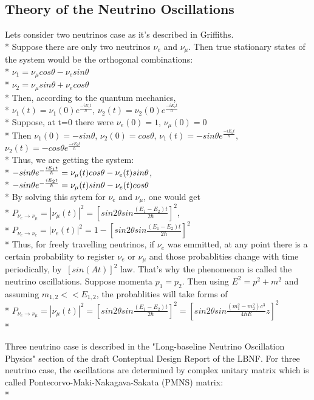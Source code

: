 \subsection{Theory of the Neutrino Oscillations}
Lets consider two neutrinos case as it's described in Griffiths\cite{ref_Griffiths}.\\*
Suppose there are only two neutrinos $\nu_e$ and $\nu_{\mu}$. Then true stationary states of the system would be the orthogonal combinations:\\*
$\nu_1=\nu_{\mu}cos\theta-\nu_esin\theta$\\*
$\nu_2=\nu_{\mu}sin\theta+\nu_ecos\theta$\\*
Then, according to the quantum mechanics,\\*
$\nu_1(t)=\nu_1(0)e^{\frac{-iE_1t}{h}}$, $\nu_2(t)=\nu_2(0)e^{\frac{-iE_2t}{h}}$\\*
Suppose, at t=0 there were $\nu_e(0)=1$, $\nu_\mu(0)=0$\\*
Then $\nu_1(0)=-sin\theta$, $\nu_2(0)=cos\theta$, $\nu_1(t)=-{sin\theta}e^{\frac{-iE_1t}{\hbar}}$, $\nu_2(t)=-{cos\theta}e^{\frac{-iE_2t}{\hbar}}$\\*
Thus, we are getting the system:\\*
$-{sin\theta}e^{-{{iE_1t} \over \hbar}}=\nu_\mu(t)cos\theta-\nu_e(t)sin\theta$,\\*
$-{sin\theta}e^{-{{iE_2t} \over \hbar}}=\nu_\mu(t)sin\theta-\nu_e(t)cos\theta$\\*
By solving this sytem for $\nu_e$ and $\nu_\mu$, one would get\\*
$P_{\nu_e \rightarrow \nu_\mu}=|\nu_\mu(t)|^2=[{sin2\theta}sin{\frac{(E_1-E_2)t}{2\hbar}}]^2$,\\*
$P_{\nu_e \rightarrow \nu_e}=|\nu_e(t)|^2=1-[{sin2\theta}sin{\frac{(E_1-E_2)t}{2\hbar}}]^2$\\*
Thus, for freely travelling neutrinos, if $\nu_e$ was emmitted, at any point there is a certain probability to register $\nu_e$ or $\nu_\mu$ and those probablities change with time periodically, by $~[sin(At)]^2$ law. That's why the phenomenon is called the neutrino oscillations.
Suppose momenta $p_1=p_2$. Then using $E^2=p^2+m^2$ and assuming $m_{1,2}<<E_{1,2}$, the probablities will take forms of\\*
$P_{\nu_e \rightarrow \nu_\mu}=|\nu_\mu(t)|^2=[{sin2\theta}sin{\frac{(E_1-E_2)t}{2\hbar}}]^2=[{sin2\theta}sin{\frac{(m_1^2-m_2^2)c^3}{4\hbar{E}}z}]^2$\\*  

Three neutrino case is described in the "Long-baseline Neutrino Oscillation Physics" section of the draft Conteptual Design Report of the LBNF. For three neutrino case, the oscillations are determined by complex unitary matrix which is called Pontecorvo-Maki-Nakagava-Sakata (PMNS) matrix:\\*

